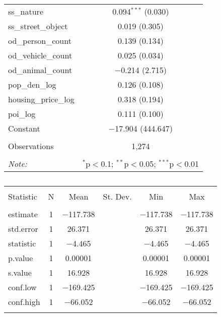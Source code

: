 \begin{table}[!htbp]
\begin{tabular}{@{\extracolsep{1pt}}lc}
  ss\_nature & 0.094$^{***}$ (0.030) \\ 
  ss\_street\_object & 0.019 (0.305) \\ 
  od\_person\_count & 0.139 (0.134) \\ 
  od\_vehicle\_count & 0.025 (0.034) \\ 
  od\_animal\_count & $-$0.214 (2.715) \\ 
  pop\_den\_log & 0.126 (0.108) \\ 
  housing\_price\_log & 0.318 (0.194) \\ 
  poi\_log & 0.111 (0.100) \\ 
  Constant & $-$17.904 (444.647) \\ 
 \hline \\[-1.8ex] 
Observations & 1,274 \\ 
\hline 
\hline \\[-1.8ex] 
\textit{Note:}  & \multicolumn{1}{r}{$^{*}$p$<$0.1; $^{**}$p$<$0.05; $^{***}$p$<$0.01} \\ 
\end{tabular} 
\end{table} 

\begin{table}[!htbp] \centering 
  \caption{} 
  \label{} 
\small 
\begin{tabular}{@{\extracolsep{1pt}}lccccc} 
\\[-1.8ex]\hline 
\hline \\[-1.8ex] 
Statistic & \multicolumn{1}{c}{N} & \multicolumn{1}{c}{Mean} & \multicolumn{1}{c}{St. Dev.} & \multicolumn{1}{c}{Min} & \multicolumn{1}{c}{Max} \\ 
\hline \\[-1.8ex] 
estimate & 1 & $-$117.738 &  & $-$117.738 & $-$117.738 \\ 
std.error & 1 & 26.371 &  & 26.371 & 26.371 \\ 
statistic & 1 & $-$4.465 &  & $-$4.465 & $-$4.465 \\ 
p.value & 1 & 0.00001 &  & 0.00001 & 0.00001 \\ 
s.value & 1 & 16.928 &  & 16.928 & 16.928 \\ 
conf.low & 1 & $-$169.425 &  & $-$169.425 & $-$169.425 \\ 
conf.high & 1 & $-$66.052 &  & $-$66.052 & $-$66.052 \\ 
\hline \\[-1.8ex] 
\end{tabular} 
\end{table} 
